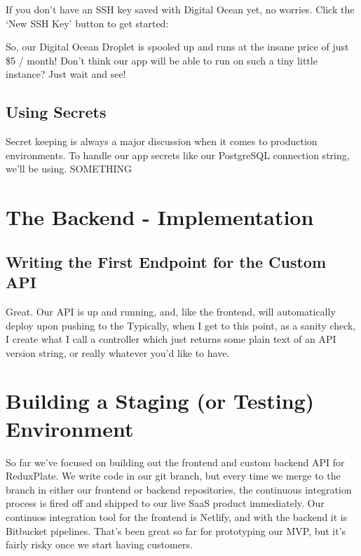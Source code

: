 \documentclass[paper=6in:9in,pagesize=pdftex,headinclude=on,footinclude=on,12pt]{scrbook}
\begin{document}

If you don't have an SSH key saved with Digital Ocean yet, no worries. Click the `New SSH Key' button to get started:

So, our Digital Ocean Droplet is spooled up and runs at the insane price of just \$5 / month! Don't think our app will be able to run on such a tiny little instance? Just wait and see!

\section{Using Secrets}

Secret keeping is always a major discussion when it comes to production environments. To handle our app secrets like our PostgreSQL connection string, we'll be using. SOMETHING

\chapter{The Backend - Implementation}

\section{Writing the First Endpoint for the Custom API}

Great. Our API is up and running, and, like the frontend, will automatically deploy upon pushing to the  Typically, when I get to this point, as a sanity check, I create what I call a  controller which just returns some plain text of an API version string, or really whatever you'd like to have.

\chapter{Building a Staging (or Testing) Environment}

So far we've focused on building out the frontend and custom backend API for ReduxPlate. We write code in our  git branch, but every time we merge to the  branch in either our frontend or backend repositories, the continuous integration process is fired off and shipped to our live SaaS product immediately. Our continuos integration tool for the frontend is Netlify, and with the backend it is Bitbucket pipelines. That's been great so far for prototyping our MVP, but it's fairly risky once we start having customers.
\end{document}
